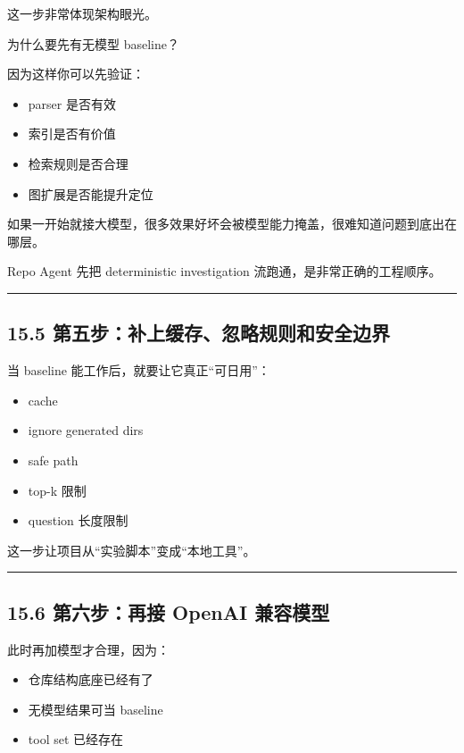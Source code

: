 \documentclass[UTF8,12pt,openany]{ctexbook}
\begin{document}
这一步非常体现架构眼光。\par

为什么要先有无模型 baseline？\par

因为这样你可以先验证：\par

\begin{itemize}
\item parser 是否有效
\item 索引是否有价值
\item 检索规则是否合理
\item 图扩展是否能提升定位
\end{itemize}

如果一开始就接大模型，很多效果好坏会被模型能力掩盖，很难知道问题到底出在哪层。\par

Repo Agent 先把 deterministic investigation 流跑通，是非常正确的工程顺序。\par

\hrule

\subsection{15.5 第五步：补上缓存、忽略规则和安全边界}

当 baseline 能工作后，就要让它真正“可日用”：\par

\begin{itemize}
\item cache
\item ignore generated dirs
\item safe path
\item top-k 限制
\item question 长度限制
\end{itemize}

这一步让项目从“实验脚本”变成“本地工具”。\par

\hrule

\subsection{15.6 第六步：再接 OpenAI 兼容模型}

此时再加模型才合理，因为：\par

\begin{itemize}
\item 仓库结构底座已经有了
\item 无模型结果可当 baseline
\item tool set 已经存在
\end{itemize}
\end{document}
